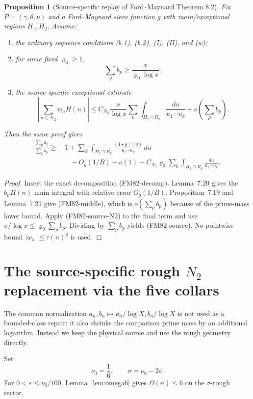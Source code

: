 \documentclass[11pt]{article}
\newtheorem{proposition}[theorem]{Proposition}
\theoremstyle{definition}
\theoremstyle{remark}
\newcommand{\1}{\mathbf 1}
\begin{document}
\begin{proposition}[Source-specific replay of Ford--Maynard Theorem 8.2]\label{prop:FM82source}
Fix $P=(\gamma,\theta,\nu)$ and a Ford--Maynard sieve function $g$ with main/exceptional regions $H_1,H_2$.
Assume:
\begin{enumerate}[label=(\roman*)]
\item the ordinary sequence conditions (b.1), (b.2), (I), (II), and (w);
\item for some fixed $\varrho_0\ge1$,
\[
 \sum_p b_p\ge \frac{x}{\varrho_0\log x};
\]
\item the source-specific exceptional estimate
\[
 \left|\sum_{n\in\mathcal N_2}w_nH(n)\right|
 \le C_{N_2}\frac{x}{\log x}
 \sum_k\int_{H_2\cap R_k}\frac{du}{u_1\cdots u_k}
 +o\!\left(\sum_pb_p\right).
\tag{FM82-source-N2}
\]
\end{enumerate}
Then the same proof gives
\[
\begin{aligned}
 \frac{\sum_pa_p}{\sum_pb_p}
 \ge&\ 1+
 \sum_k\int_{H_1\cap R_k}
 \frac{(1\star g)(u)}{u_1\cdots u_k}\,du\\
 &\quad -O_g(1/B)-o(1)
 -C_{N_2}\varrho_0
 \sum_k\int_{H_2\cap R_k}\frac{du}{u_1\cdots u_k}.
\end{aligned}
\tag{FM82-source}
\]
\end{proposition}
\begin{proof}
Insert the exact decomposition (FM82-decomp).  Lemma~7.20 gives the $b_nH(n)$ main integral with relative
error $O_g(1/B)$.  Proposition~7.19 and Lemma~7.21 give (FM82-middle), which is
$o(\sum_pb_p)$ because of the prime-mass lower bound.  Apply (FM82-source-N2) to the final term and use
$x/\log x\le\varrho_0\sum_pb_p$.  Dividing by $\sum_pb_p$ yields (FM82-source).
No pointwise bound $|w_n|\le\tau(n)^\varrho$ is used.
\end{proof}

\section{The source-specific rough $N_2$ replacement via the five collars}
\label{sec:N2-collar}

The common normalization $a_n,b_n\mapsto a_n/\log X,b_n/\log X$ is not used as a bounded-class repair: it also
shrinks the comparison prime mass by an additional logarithm.  Instead we keep the physical source and use the
rough geometry directly.

Set
\[
 \nu_0=\frac16,\qquad \sigma=\nu_0-2\varepsilon.
\]
For $0<\varepsilon\le\nu_0/100$, Lemma~\ref{lem:omega6} gives $\Omega(n)\le6$ on the $\sigma$-rough sector.
\end{document}
